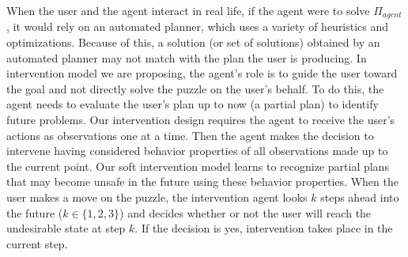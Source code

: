 \documentclass[doctor]{thesis} %
\theoremstyle{plain}
\begin{document}
When the user and the agent interact in real life, if the agent were to solve $\Pi_{agent}$, it would rely on an automated planner, which uses a variety of heuristics and optimizations. Because of this, a solution (or set of solutions) obtained by an automated planner may not match with the plan the user is producing. In intervention model we are proposing, the agent's role is to guide the user toward the goal and not directly solve the puzzle on the user's behalf. To do this, the agent needs to evaluate the user's plan up to now (a partial plan) to identify future problems. Our intervention design requires the agent to receive the user's actions as observations one at a time. Then the agent makes the decision to intervene having considered behavior properties of all observations made up to the current point. Our soft intervention model learns to recognize partial plans that may become unsafe in the future using these behavior properties. When the user makes a move on the puzzle, the intervention agent looks $k$ steps ahead into the future ($k \in \lbrace1,2,3\rbrace$) and decides whether or not the user will reach the undesirable state at step $k$. If the decision is yes, intervention takes place in the current step.
 
\end{document}

